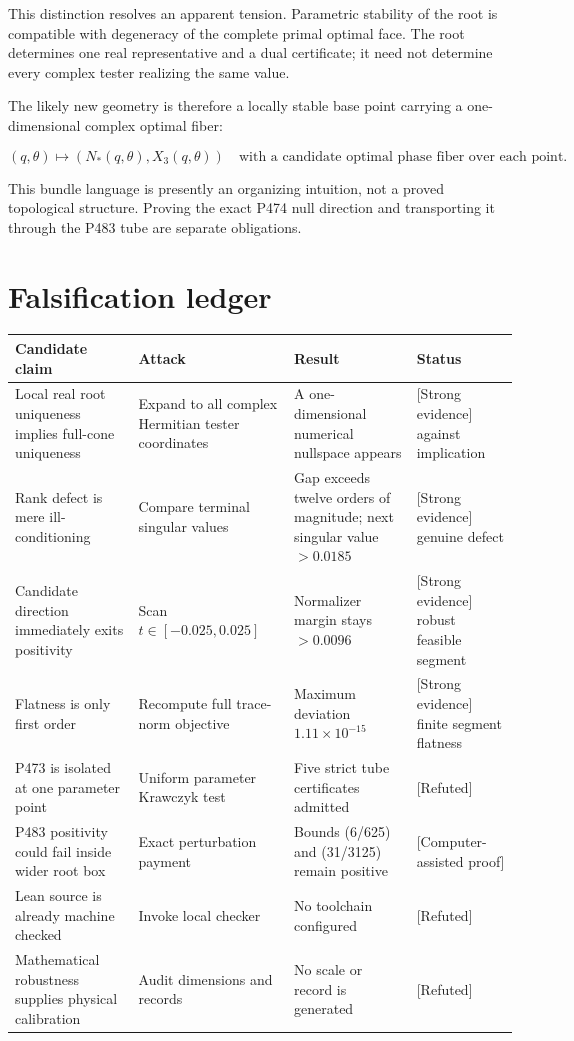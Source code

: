 \documentclass[11pt,a4paper,openany]{report}
\newcommand{\statusStrong}{\textcolor{finblue}{[Strong evidence]}}
\newcommand{\statusRefuted}{\textcolor{finred}{[Refuted]}}
\begin{document}
This distinction resolves an apparent tension. Parametric stability of the root is compatible with degeneracy of the complete primal optimal face. The root determines one real representative and a dual certificate; it need not determine every complex tester realizing the same value.

The likely new geometry is therefore a locally stable base point carrying a one-dimensional complex optimal fiber:

\[
(q,\theta)
\longmapsto
(N_*(q,\theta),X_3(q,\theta))
\quad\text{with a candidate optimal phase fiber over each point.}
\]

This bundle language is presently an organizing intuition, not a proved topological structure. Proving the exact P474 null direction and transporting it through the P483 tube are separate obligations.

\chapter{Falsification ledger}

\begin{center}
\begingroup\small
\setlength{\tabcolsep}{2.5pt}
\renewcommand{\arraystretch}{1.16}
\begin{longtable}{@{}p{}p{}p{}p{}@{}}
\toprule
\textbf{Candidate claim} & \textbf{Attack} & \textbf{Result} & \textbf{Status} \\
\midrule
\endhead
Local real root uniqueness implies full-cone uniqueness & Expand to all complex Hermitian tester coordinates & A one-dimensional numerical nullspace appears & \statusStrong{} against implication \\
Rank defect is mere ill-conditioning & Compare terminal singular values & Gap exceeds twelve orders of magnitude; next singular value \(>0.0185\) & \statusStrong{} genuine defect \\
Candidate direction immediately exits positivity & Scan \(t\in[-0.025,0.025]\) & Normalizer margin stays \(>0.0096\) & \statusStrong{} robust feasible segment \\
Flatness is only first order & Recompute full trace-norm objective & Maximum deviation \(1.11\times10^{-15}\) & \statusStrong{} finite segment flatness \\
P473 is isolated at one parameter point & Uniform parameter Krawczyk test & Five strict tube certificates admitted & \statusRefuted{} \\
P483 positivity could fail inside wider root box & Exact perturbation payment & Bounds (6/\allowbreak{}625) and (31/\allowbreak{}3125) remain positive & \textcolor{fingreen}{[Computer-assisted proof]} \\
Lean source is already machine checked & Invoke local checker & No toolchain configured & \statusRefuted{} \\
Mathematical robustness supplies physical calibration & Audit dimensions and records & No scale or record is generated & \statusRefuted{} \\
\bottomrule
\end{longtable}
\endgroup
\end{center}
\end{document}
